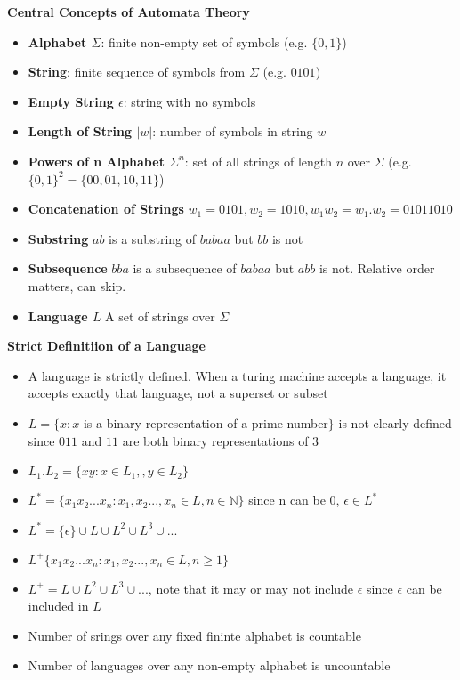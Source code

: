 \documentclass[10pt, landscape]{article}
\begin{document}
\begin{multicols}{4}
\textbf{Central Concepts of Automata Theory}
\begin{itemize}
  \item \textbf{Alphabet $\Sigma$}: finite non-empty set of symbols (e.g. $\{0,1\}$)
  \item \textbf{String}: finite sequence of symbols from $\Sigma$ (e.g. $0101$)
  \item \textbf{Empty String $\epsilon$}: string with no symbols
  \item \textbf{Length of String $|w|$}: number of symbols in string $w$
  \item \textbf{Powers of n Alphabet $\Sigma^n$}: set of all strings of length $n$ over $\Sigma$ (e.g. $\{0,1\}^2 = \{00,01,10,11\}$)
  \item \textbf{Concatenation of Strings} $w_1 = 0101, w_2 = 1010, w_1w_2 = w_1 . w_2 = 01011010$
  \item \textbf{Substring} $ab$ is a substring of $babaa$ but $bb$ is not 
  \item \textbf{Subsequence} $bba$ is a subsequence of $babaa$ but $abb$ is not. Relative order matters, can skip.
  \item \textbf{Language $L$} A set of strings over $\Sigma$ 
\end{itemize}

\textbf{Strict Definitiion of a Language}
\begin{itemize}
  \item A language is strictly defined. When a turing machine accepts a language, it accepts exactly that language, not a superset or subset
  \item $L=\{x : x$ is a binary representation of a prime number$\}$ is not clearly defined since $011$ and $11$ are both binary representations of $3$
  \item $L_1 . L_2 = \{ xy : x \in L_1,, y \in L_2\}$
  \item $L^* = \{ x_1x_2...x_n : x_1, x_2..., x_n \in L, n \in \mathbb{N} \}$ since n can be 0, $\epsilon \in L^*$
  \item $L^* = \{ \epsilon \} \cup L \cup L^2 \cup L^3 \cup ...$
  \item $L^+ \{ x_1x_2...x_n : x_1, x_2..., x_n \in L, n \ge 1 \}$
  \item $L^+ = L \cup L^2 \cup L^3 \cup ...$, note that it may or may not include $\epsilon$ since $\epsilon$ can be included in $L$
  \item Number of srings over any fixed fininte alphabet is countable 
  \item Number of languages over any non-empty alphabet is uncountable
\end{itemize}


\end{multicols}
\end{document}
